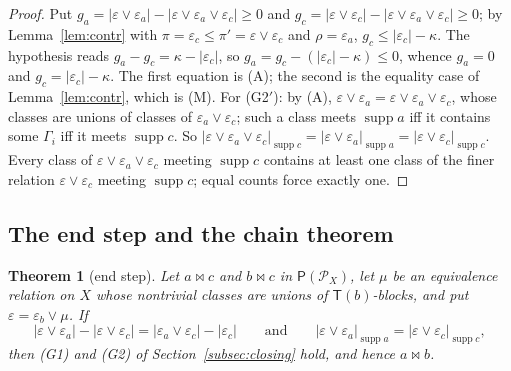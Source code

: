 \documentclass[11pt]{amsart}
\newtheorem{theorem}{Theorem}[section]
\theoremstyle{definition}
\renewcommand{\P}{\mathcal{P}}      %
\newcommand{\PA}{\mathsf{P}}         %
\newcommand{\supp}{\operatorname{supp}}
\newcommand{\T}{\mathsf{T}}
\newcommand{\mt}{\bowtie}      %
\begin{document}
\begin{proof}
Put $g_a=|\varepsilon\vee\varepsilon_a|-|\varepsilon\vee\varepsilon_a\vee\varepsilon_c|\ge0$ and $g_c=|\varepsilon\vee\varepsilon_c|-|\varepsilon\vee\varepsilon_a\vee\varepsilon_c|\ge0$; by Lemma~\ref{lem:contr} with $\pi=\varepsilon_c\le\pi'=\varepsilon\vee\varepsilon_c$ and $\rho=\varepsilon_a$, $g_c\le|\varepsilon_c|-\kappa$. The hypothesis reads $g_a-g_c=\kappa-|\varepsilon_c|$, so $g_a=g_c-(|\varepsilon_c|-\kappa)\le0$, whence $g_a=0$ and $g_c=|\varepsilon_c|-\kappa$. The first equation is (A); the second is the equality case of Lemma~\ref{lem:contr}, which is (M). For (G2$'$): by (A), $\varepsilon\vee\varepsilon_a=\varepsilon\vee\varepsilon_a\vee\varepsilon_c$, whose classes are unions of classes of $\varepsilon_a\vee\varepsilon_c$; such a class meets $\supp a$ iff it contains some $\Gamma_i$ iff it meets $\supp c$. So $|\varepsilon\vee\varepsilon_a\vee\varepsilon_c|_{\supp c}=|\varepsilon\vee\varepsilon_a|_{\supp a}=|\varepsilon\vee\varepsilon_c|_{\supp c}$. Every class of $\varepsilon\vee\varepsilon_a\vee\varepsilon_c$ meeting $\supp c$ contains at least one class of the finer relation $\varepsilon\vee\varepsilon_c$ meeting $\supp c$; equal counts force exactly one.
\end{proof}

\subsection{The end step and the chain theorem}\label{subsec:endstep}

\begin{theorem}[end step]\label{thm:endstep}
Let $a\mt c$ and $b\mt c$ in $\PA(\P_X)$, let $\mu$ be an equivalence relation on $X$ whose nontrivial classes are unions of $\T(b)$-blocks, and put $\varepsilon=\varepsilon_b\vee\mu$. If
\[
|\varepsilon\vee\varepsilon_a|-|\varepsilon\vee\varepsilon_c|=|\varepsilon_a\vee\varepsilon_c|-|\varepsilon_c|
\qquad\text{and}\qquad
|\varepsilon\vee\varepsilon_a|_{\supp a}=|\varepsilon\vee\varepsilon_c|_{\supp c},
\]
then \textup{(G1)} and \textup{(G2)} of Section~\ref{subsec:closing} hold, and hence $a\mt b$.
\end{theorem}
\end{document}
